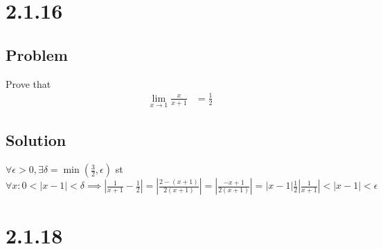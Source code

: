 \documentclass[12pt]{article}
\newcommand{\round}[1]{\left(       #1 \right)      }
\newcommand{\abs}  [1]{\left|       #1 \right|      }
\begin{document}
\section*{2.1.16}

\subsection*{Problem}
Prove that
\begin{align*}
    \lim_{x \to 1} \frac{x}{x + 1} &= \frac{1}{2}
\end{align*}

\subsection*{Solution}
$\forall \epsilon > 0, \exists \delta = \min\round{\frac{3}{2}, \epsilon}$ st $\forall x : 0 < \abs{x - 1} < \delta \implies \abs{\frac{1}{x + 1} - \frac{1}{2}} = \abs{\frac{2 - (x + 1)}{2(x + 1)}} = \abs{\frac{-x + 1}{2(x + 1)}} = \abs{x - 1} \frac{1}{2} \abs{\frac{1}{x + 1}} < \abs{x - 1} < \epsilon$



\section*{2.1.18}
\end{document}
